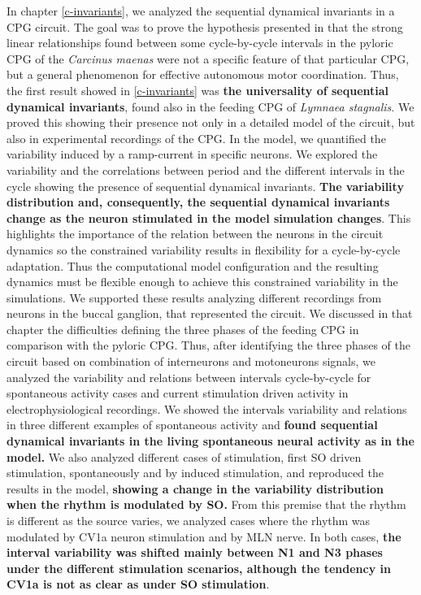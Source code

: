 	
In chapter \ref{c-invariants}, we analyzed the sequential dynamical invariants in a CPG circuit. The goal was to prove the hypothesis presented in \cite{elices_robust_2019} that the strong linear relationships found between some cycle-by-cycle intervals in the pyloric CPG of the \textit{Carcinus maenas} were not a specific feature of that particular CPG, but a general phenomenon for effective autonomous motor coordination. Thus, the first result showed in \ref{c-invariants} was \textbf{the universality of sequential dynamical invariants}, found also in the feeding CPG of \textit{Lymnaea stagnalis}. We proved this showing their presence not only in a detailed model of the circuit, but also in experimental recordings of the CPG. In the model, we quantified the variability induced by a ramp-current in specific neurons. We explored the variability and the correlations between period and the different intervals in the cycle showing the presence of sequential dynamical invariants.  \textbf{The variability distribution and, consequently, the sequential dynamical invariants change as the neuron stimulated in the model simulation changes}. This highlights the importance of the relation between the neurons in the circuit dynamics so the constrained variability results in flexibility for a cycle-by-cycle adaptation. Thus the computational model configuration and the resulting dynamics must be flexible enough to achieve this constrained variability in the simulations. We supported these results analyzing different recordings from neurons in the buccal ganglion, that represented the circuit. We discussed in that chapter the difficulties defining the three phases of the feeding CPG in comparison with the pyloric CPG. Thus, after identifying the three phases of the circuit based on combination of interneurons and motoneurons signals, we analyzed the variability and relations between intervals cycle-by-cycle for spontaneous activity cases and current stimulation driven activity in electrophysiological recordings. We showed the intervals variability and relations in three different examples of spontaneous activity and \textbf{found sequential dynamical invariants in the living spontaneous neural activity as in the model.} We also analyzed different cases of stimulation, first SO driven stimulation, spontaneously and by induced stimulation, and reproduced the results in the model, \textbf{showing a change in the variability distribution when the rhythm is modulated by SO.} From this premise that the rhythm is different as the source varies, we analyzed cases where the rhythm was modulated by CV1a neuron stimulation and by MLN nerve. In both cases, \textbf{the interval variability was shifted mainly between N1 and N3 phases under the different stimulation scenarios, although the tendency in CV1a is not as clear as under SO stimulation}.

